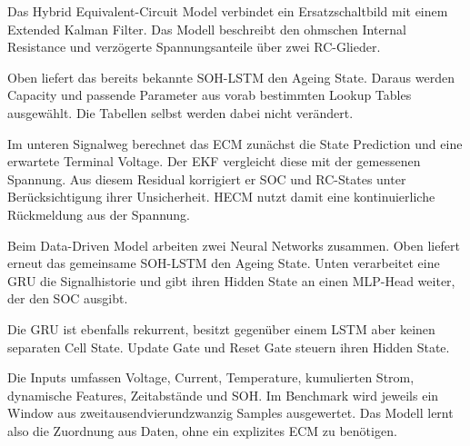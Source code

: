 
\begin{sprechtext}

Das Hybrid Equivalent-Circuit Model verbindet ein Ersatzschaltbild mit einem Extended Kalman Filter. Das Modell beschreibt den ohmschen Internal Resistance und verzögerte Spannungsanteile über zwei RC-Glieder.

Oben liefert das bereits bekannte SOH-LSTM den Ageing State. Daraus werden Capacity und passende Parameter aus vorab bestimmten Lookup Tables ausgewählt. Die Tabellen selbst werden dabei nicht verändert.

Im unteren Signalweg berechnet das ECM zunächst die State Prediction und eine erwartete Terminal Voltage. Der EKF vergleicht diese mit der gemessenen Spannung. Aus diesem Residual korrigiert er SOC und RC-States unter Berücksichtigung ihrer Unsicherheit. HECM nutzt damit eine kontinuierliche Rückmeldung aus der Spannung.

\end{sprechtext}


\begin{sprechtext}

Beim Data-Driven Model arbeiten zwei Neural Networks zusammen. Oben liefert erneut das gemeinsame SOH-LSTM den Ageing State. Unten verarbeitet eine GRU die Signalhistorie und gibt ihren Hidden State an einen MLP-Head weiter, der den SOC ausgibt.

Die GRU ist ebenfalls rekurrent, besitzt gegenüber einem LSTM aber keinen separaten Cell State. Update Gate und Reset Gate steuern ihren Hidden State.

Die Inputs umfassen Voltage, Current, Temperature, kumulierten Strom, dynamische Features, Zeitabstände und SOH. Im Benchmark wird jeweils ein Window aus zweitausendvierundzwanzig Samples ausgewertet. Das Modell lernt also die Zuordnung aus Daten, ohne ein explizites ECM zu benötigen.

\end{sprechtext}


